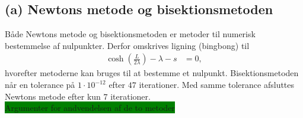 \subsection*{(a) Newtons metode og bisektionsmetoden}
%
Både Newtons metode og bisektionsmetoden er metoder til numerisk bestemmelse af nulpunkter.
Derfor omskrives ligning (bingbong) til
%
\begin{align*}
\cosh( \frac{L}{2\lambda}) - \lambda - s &= 0,
\end{align*}
%
hvorefter metoderne kan bruges til at bestemme et nulpunkt.
Bisektionsmetoden når en tolerance på $1\cdot 10^{-12}$ efter $47$ iterationer.
Med samme tolerance afsluttes Newtons metode efter kun $7$ iterationer.
\\

\colorbox{green}{Argumenter for andvendelsen af de to metoder}